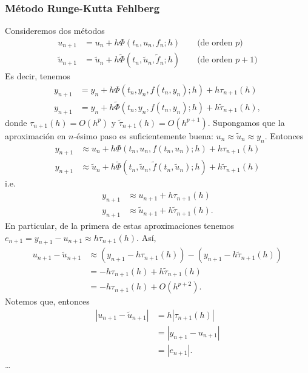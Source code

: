 \documentclass[11pt,letterpaper]{report}
\begin{document}
\subsubsection{Método Runge-Kutta Fehlberg}
Consideremos dos métodos
\begin{align}
  u_{n+1}
    &= u_n + h\Phi(t_n,u_n,f_n;h)
    \qquad
    \text{(de orden $p$)} \\
  \tilde u_{n+1}
    &= \tilde u_n
    + h\tilde \Phi(t_n,\tilde u_n,\tilde f_n;h)
    \qquad
    \text{(de orden $p+1$)}
\end{align}
Es decir, tenemos
\begin{align}
  y_{n+1}
  &=
  y_n
  +
  h
  \Phi(t_n,y_n,f(t_n,y_n);h)
  + h\tau_{n+1}(h)
  \\
  y_{n+1}
  &=
  y_n
  +
  h
  \tilde \Phi(t_n,y_n,f(t_n,y_n);h)
  + h\tilde\tau_{n+1}(h)
,\end{align}
donde $\tau_{n+1}(h) = O(h^p)$ y $\tilde \tau_{n+1}(h) = O(h^{p+1})$.
Supongamos que la aproximación en $n$-ésimo paso es suficientemente
buena: $u_n\approx\tilde u_{n}\approx y_n$. Entonces
\begin{align}
  y_{n+1}
    &\approx
    u_n
    + h\Phi(t_n,u_n,f(t_n,u_n);h)
    + h\tau_{n+1}(h)
  \\
  y_{n+1}
    &\approx
    \tilde u_n
    + h\tilde \Phi(t_n,\tilde u_n,\tilde f(t_n,\tilde u_n);h)
    + h \tilde\tau_{n+1}(h)
\end{align}
i.e.
\begin{align}
  y_{n+1}
    &\approx
    u_{n+1}
    + h\tau_{n+1}(h)
  \\
  y_{n+1}
    &\approx
    \tilde u_{n+1}
    + h\tilde\tau_{n+1}(h)
.\end{align}
En particular, de la primera de estas aproximaciones
tenemos $e_{n+1} = y_{n+1} - u_{n+1} \approx h \tau_{n+1}(h)$. Así,
\begin{align}
  u_{n+1} - \tilde u_{n+1}
  &\approx (y_{n+1} - h\tau_{n+1}(h)) - (y_{n+1} -
  h\tilde\tau_{n+1}(h))
  \\
  &= - h\tau_{n+1}(h) + h\tilde\tau_{n+1}(h) \\
  &= - h\tau_{n+1}(h) + O(h^{p+2}).
\end{align}
Notemos que, entonces
\begin{align}
  |u_{n+1} - \tilde u_{n+1}|
  &= h|\tau_{n+1}(h)| \\
  &= |y_{n+1} - u_{n+1}| \\
  &= |e_{n+1}|.
\end{align}
\dots
{}
\end{document}
